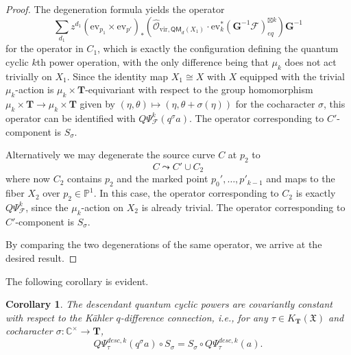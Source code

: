 \documentclass[reqno]{amsart}
\numberwithin{equation}{section}
\numberwithin{equation}{section}
\numberwithin{equation}{section}
\newtheorem{cor}[thm]{Corollary}
\theoremstyle{definition}
\theoremstyle{remark}
\theoremstyle{remark}
\newcommand{\curly}{\mathrel{\leadsto}}
\begin{document}
\begin{proof}
    The degeneration formula yields the operator
    \begin{equation}
       \sum_{d_1} z^{d_1} (\mathrm{ev}_{p_1} \times \mathrm{ev}_{p'} )_*  \left(  \hat{\mathcal{O}}_{\mathrm{vir} ,\mathsf{QM}_d (X_1)} \cdot   \mathrm{ev}_k^* (\mathbf{G}^{-1}\mathcal{F})_{eq}^{\boxtimes k} \right) \mathbf{G}^{-1}
    \end{equation}
    for the operator in $C_1$, which is exactly the configuration defining the quantum cyclic $k$th power operation, with the only difference being that $\mu_k$ does not act trivially on $X_1$. Since the identity map $X_1 \cong X$ with $X$ equipped with the trivial $\mu_k$-action is $\mu_k \times \mathbf{T}$-equivariant with respect to the group homomorphism $\mu_k \times \mathbf{T} \to \mu_k \times \mathbf{T}$ given by $(\eta, \theta) \mapsto (\eta, \theta + \sigma(\eta))$ for the cocharacter $\sigma$, this operator can be identified with $Q\Psi^k_\mathcal{F} (q^\sigma a)$.  The operator corresponding to $C'$-component is $S_\sigma$.

    Alternatively we may degenerate the source curve $C$ at $p_2$ to
    \begin{equation}
        C \curly C' \cup C_2
    \end{equation}
    where now $C_2$ contains $p_2$ and the marked point $p_0' , \dots, p'_{k-1}$ and maps to the fiber $X_2$ over $p_2 \in \mathbb{P}^1$. In this case, the operator corresponding to $C_2$ is exactly $Q\Psi^k_\mathcal{F}$, since the $\mu_k$-action on $X_2$ is already trivial. The operator corresponding to $C'$-component is $S_\sigma$.

    By comparing the two degenerations of the same operator, we arrive at the desired result.
    
    
\end{proof}
The following corollary is evident.

\begin{cor}
    The descendant quantum cyclic powers are covariantly constant with respect to the K\"ahler $q$-difference connection, i.e., for any $\tau \in K_{\mathbf{T}}(\mathfrak{X})$ and cocharacter $\sigma: \mathbb{C}^{\times} \to \mathbf{T}$,
    \begin{equation}
        Q\Psi_\tau^{desc, k}(q^{\sigma} a) \circ S_{\sigma} = S_{\sigma} \circ Q\Psi_\tau^{desc, k}(a).
    \end{equation}
\end{cor}
\end{document}

